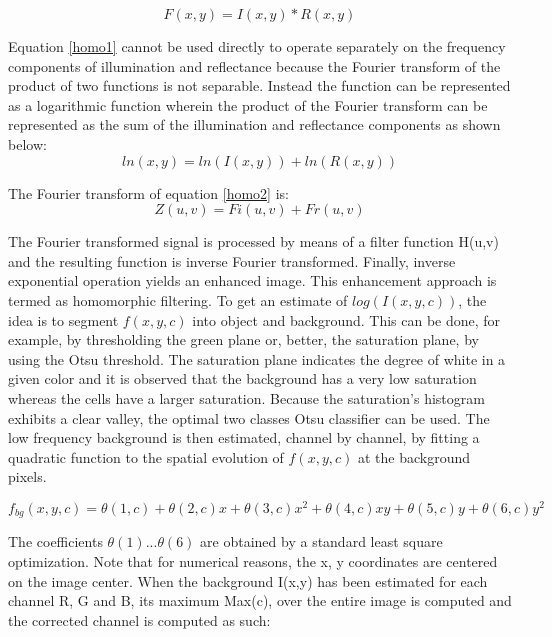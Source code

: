 {	\begin{equation}\label{homo1}
	F(x,y) = I(x,y) * R(x,y)
	\end{equation}
	
	Equation \ref{homo1} cannot be used directly to operate separately on the frequency components of illumination and reflectance because the Fourier transform of the product of two functions is not separable. Instead the function can be represented as a logarithmic function wherein the product of the Fourier transform can be represented as the sum of the illumination and reflectance components as shown below:
	\begin{equation}\label{homo2}
	ln(x,y) = ln(I(x,y)) + ln(R(x,y))
	\end{equation}
	
	The Fourier transform of equation \ref{homo2} is:
	\begin{equation}\label{homo3}
	Z(u,v) = Fi(u,v) + Fr(u,v)
	\end{equation}
	
	The Fourier transformed signal is processed by means of a filter function H(u,v) and the resulting function is inverse Fourier transformed. Finally, inverse exponential operation yields an enhanced image. This enhancement approach is termed as homomorphic filtering. 
	To get an estimate of $log(I(x,y,c))$, the idea is to segment $f(x,y,c)$ into object and background. This can be done, for example, by thresholding the green plane or, better, the saturation plane, by using the Otsu threshold. The saturation plane indicates the degree of white in a given color and it is observed that the background has a very low saturation whereas the cells have a larger saturation. Because the saturation's histogram exhibits a clear valley, the optimal two classes Otsu classifier can be used.
	The low frequency background is then estimated, channel by channel, by fitting a quadratic function to the spatial evolution of $f(x,y,c)$ at the background pixels.
	
	\begin{equation}\label{homo4}
	f_{bg}(x,y,c)=\theta(1,c)+\theta(2,c)x+\theta(3,c)x^2 +\theta(4,c)xy+\theta(5,c)y+\theta(6,c)y^2  
	\end{equation}
	
	The coefficients $\theta(1) ... \theta(6)$ are obtained by a standard least square optimization. Note that for numerical reasons, the x, y coordinates are centered on the image center.
	When the background I(x,y) has been estimated for each channel R, G and B, its maximum Max(c), over the entire image is computed and the corrected channel is computed as such:
	
}
